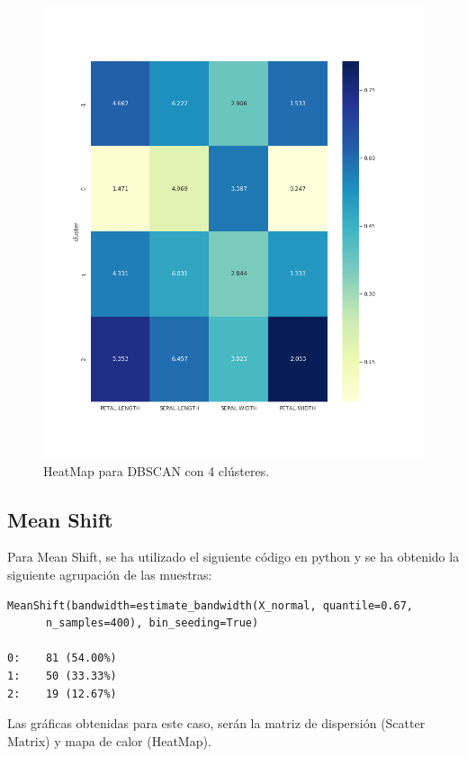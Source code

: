 \documentclass[a4paper, 20pt]{article}
\begin{document}
\begin{figure}[h]
\centering
\includegraphics[scale=0.62]{dani/heatmapDBSCANIRIS.png}
\caption{HeatMap para DBSCAN con 4 clústeres.}
\label{hmdb}
\end{figure}

\clearpage

\subsection{Mean Shift}


Para Mean Shift, se ha utilizado el siguiente código en python y se ha obtenido la siguiente agrupación de las muestras:\\

\begin{lstlisting}
MeanShift(bandwidth=estimate_bandwidth(X_normal, quantile=0.67, 
	  n_samples=400), bin_seeding=True)

0:    81 (54.00%)
1:    50 (33.33%)
2:    19 (12.67%)
\end{lstlisting}

Las gráficas obtenidas para este caso, serán la matriz de dispersión (Scatter Matrix) y mapa de calor (HeatMap).
\end{document}
